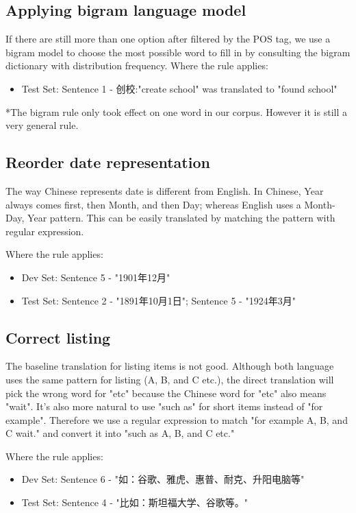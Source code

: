 \documentclass[11pt]{article} %
\begin{document}
\begin{CJK}{UTF8}{gbsn}
\subsection{Applying bigram language model}
If there are still more than one option after filtered by the POS tag, we use a bigram model to choose the most possible word to fill in by consulting the bigram dictionary with distribution frequency.
Where the rule applies:
\begin{itemize}
\item Test Set: Sentence 1 - 创校:"create school"  was translated to  "found school"
\end{itemize}
*The bigram rule only took effect on one word in our corpus. However it is still a very general rule.

\subsection{Reorder date representation}
The way Chinese represents date is different from English. In Chinese, Year always comes first, then Month, and then Day; whereas English uses a Month-Day, Year pattern. This can be easily translated by matching the pattern with regular expression.

Where the rule applies:
\begin{itemize}
\item Dev Set: Sentence 5 - "1901年12月"
\item Test Set: Sentence 2 - "1891年10月1日"; Sentence 5 - "1924年3月"
\end{itemize}

\subsection{Correct listing}
The baseline translation for listing items is not good. Although both language uses the same pattern for listing (A, B, and C etc.), the direct translation will pick the wrong word for "etc" because the Chinese word for "etc" also means "wait". It's also more natural to use "such as" for short items instead of "for example". Therefore we use a regular expression to match "for example A, B, and C wait." and convert it into "such as A, B, and C etc."

Where the rule applies:
\begin{itemize}
\item Dev Set: Sentence 6 - "如：谷歌、雅虎、惠普、耐克、升阳电脑等"
\item Test Set: Sentence 4 - "比如：斯坦福大学、谷歌等。"
\end{itemize}


\end{CJK}
\end{document}
